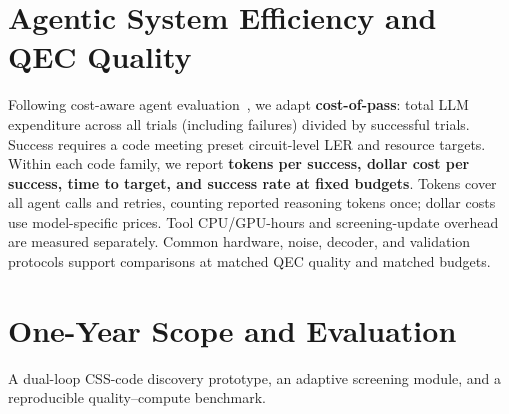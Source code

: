 \documentclass[11pt]{article}
\begin{document}
\section*{Agentic System Efficiency and QEC Quality}
Following cost-aware agent evaluation~\cite{agentsmatter,costpass}, we adapt \textbf{cost-of-pass}: total LLM expenditure across all trials (including failures) divided by successful trials. Success requires a code meeting preset circuit-level LER and resource targets. Within each code family, we report \textbf{tokens per success, dollar cost per success, time to target, and success rate at fixed budgets}. Tokens cover all agent calls and retries, counting reported reasoning tokens once; dollar costs use model-specific prices. Tool CPU/GPU-hours and screening-update overhead are measured separately. Common hardware, noise, decoder, and validation protocols support comparisons at matched QEC quality and matched budgets.

\section*{One-Year Scope and Evaluation}
A dual-loop CSS-code discovery prototype, an adaptive screening module, and a reproducible quality–compute benchmark.
\end{document}
